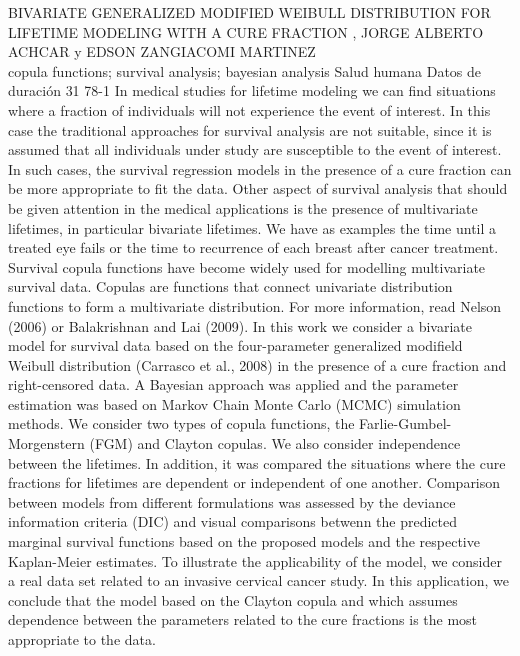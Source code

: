 \A
{BIVARIATE GENERALIZED MODIFIED WEIBULL DISTRIBUTION FOR LIFETIME MODELING WITH A CURE FRACTION}
{, JORGE ALBERTO ACHCAR y EDSON ZANGIACOMI MARTINEZ}
{
\\}
{copula functions; survival analysis; bayesian analysis} 
 {Salud humana} 
 {Datos de duración} 
 {31} 
 {78-1}
{In medical studies for lifetime modeling we can find situations where a fraction of individuals will not experience the event of interest. In this case the traditional approaches for survival analysis are not suitable, since it is assumed that all individuals under study are susceptible to the event of interest. In such cases, the survival regression models in the presence of a cure fraction can be more appropriate to fit the data. Other aspect of survival analysis that should be given attention in the medical applications is the presence of multivariate lifetimes, in particular bivariate lifetimes. We have as examples the time until a treated eye fails or the time to recurrence of each breast after cancer treatment. Survival copula functions have become widely used for modelling multivariate survival data. Copulas are functions that connect univariate distribution functions to form a multivariate distribution. For more information, read Nelson (2006) or Balakrishnan and Lai (2009). In this work we consider a bivariate model for survival data based on the four-parameter generalized modifield Weibull distribution (Carrasco et al., 2008) in the presence of a cure fraction and right-censored data. A Bayesian approach was applied and the parameter estimation was based on Markov Chain Monte Carlo (MCMC) simulation methods. We consider two types of copula functions, the Farlie-Gumbel-Morgenstern (FGM) and Clayton copulas. We also consider independence between the lifetimes. In addition, it was compared the situations where the cure fractions for lifetimes are dependent or independent of one another. Comparison between models from different formulations was assessed by the deviance information criteria (DIC) and visual comparisons betwenn the predicted marginal survival functions based on the proposed models and the respective Kaplan-Meier estimates. To illustrate the applicability of the model, we consider a real data set related to an invasive cervical cancer study. In this application, we conclude that the model based on the Clayton copula and which assumes dependence between the parameters related to the cure fractions is the most appropriate to the data.}
